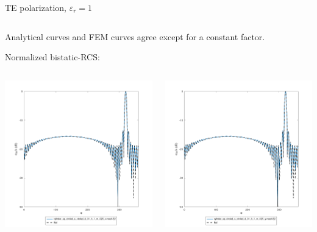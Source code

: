 \begin{frame}{TE polarization, $\varepsilon_r=1$}
\begin{columns}
\end{columns}

\vbs

Analytical curves and FEM curves agree except for a constant factor. 

Normalized bistatic-RCS:

\vbss

\begin{columns}

\includegraphics[width=\linewidth]{results/FF/cylD_01_H_1_M_025_X/epr1_TE_norm.png}


\includegraphics[width=\linewidth]{results/FF/cylD_01_H_1_M_025_Y/epr1_TE_norm.png}


\end{columns}
\end{frame}
